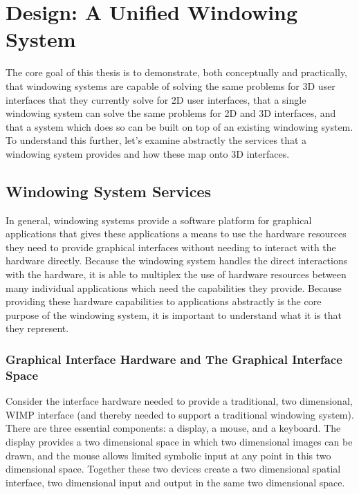 \chapter{Design: A Unified Windowing System}
The core goal of this thesis is to demonstrate, both conceptually and practically, that windowing systems are capable of solving the same problems for 3D user interfaces that they currently solve for 2D user interfaces, that a single windowing system can solve the same problems for 2D and 3D interfaces, and that a system which does so can be built on top of an existing windowing system. To understand this further, let’s examine abstractly the services that a windowing system provides and how these map onto 3D interfaces.

\section{Windowing System Services}

In general, windowing systems provide a software platform for graphical applications that gives these applications a means to use the hardware resources they need to provide graphical interfaces without needing to interact with the hardware directly. Because the windowing system handles the direct interactions with the hardware, it is able to multiplex the use of hardware resources between many individual applications which need the capabilities they provide. Because providing these hardware capabilities to applications abstractly is the core purpose of the windowing system, it is important to understand what it is that they represent.

\subsection{Graphical Interface Hardware and The Graphical Interface Space}

Consider the interface hardware needed to provide a traditional, two dimensional, WIMP interface (and thereby needed to support a traditional windowing system). There are three essential components: a display, a mouse, and a keyboard. The display provides a two dimensional space in which two dimensional images can be drawn, and  the mouse allows limited symbolic input at any point in this two dimensional space. Together these two devices create a two dimensional spatial interface, two dimensional input and output in the same two dimensional space. 

